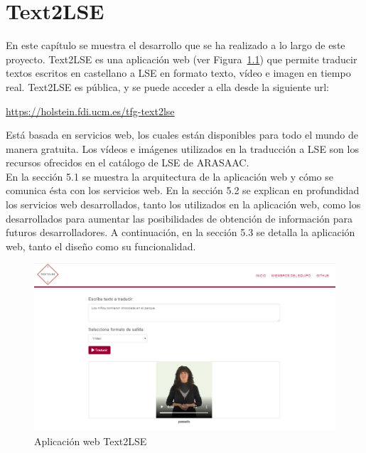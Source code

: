%
%

\chapter{Text2LSE}


En este capítulo se muestra el desarrollo que se ha realizado a lo largo de este proyecto. Text2LSE es una aplicación web (ver Figura~\ref {fig: imgWebText2LSE}) que permite traducir textos escritos en castellano a LSE en formato texto, vídeo e imagen en tiempo real. Text2LSE es pública, y se puede acceder a ella desde la siguiente url: 

\begin{shaded}
	\url{https://holstein.fdi.ucm.es/tfg-text2lse }	
\end{shaded}

Está basada en servicios web, los cuales están disponibles para todo el mundo de manera gratuita. Los vídeos e imágenes utilizados en la traducción a LSE son los recursos ofrecidos en el catálogo de LSE de ARASAAC. \\

En la sección 5.1 se muestra la arquitectura de la aplicación web y cómo se comunica ésta con los servicios web. En la sección 5.2 se explican en profundidad los servicios web desarrollados, tanto los utilizados en la aplicación web, como los desarrollados para aumentar las posibilidades de obtención de información para futuros desarrolladores. A continuación, en la sección 5.3 se detalla la aplicación web, tanto el diseño como su funcionalidad. \\


\begin{figure}[]
	\centering
	\includegraphics[width=1\textwidth]{Imagenes/Fuentes/Text2LSE/WebText2LSE.png}
	\caption{Aplicación web Text2LSE }
	\label {fig: imgWebText2LSE}
\end{figure}

